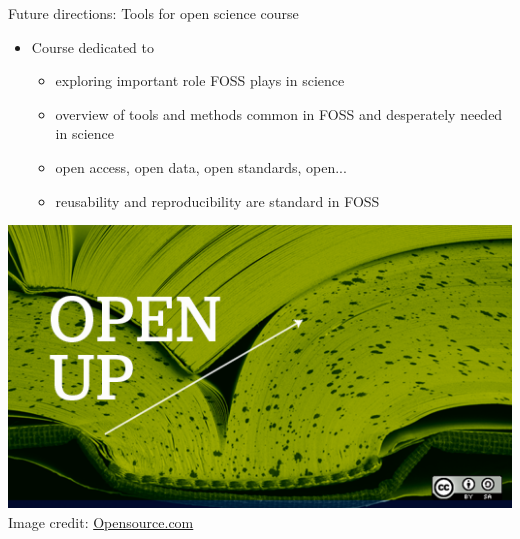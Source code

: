 \documentclass[xcolor={dvipsnames,usenames},beamer,aspectratio=169]{beamer}
\begin{document}
\begin{frame}{Future directions: Tools for open science course}

\begin{overlayarea}{\textwidth}{\textheight}

\begin{itemize}
 \item Course dedicated to
 \begin{itemize}
  \item exploring important role FOSS plays in science
  \item overview of tools and methods common in FOSS and desperately needed in science
  \item open access, open data, open standards, open...
  \item reusability and reproducibility are standard in FOSS
 \end{itemize}
\end{itemize}

\smallskip

\centering
\includegraphics[height=0.5\textheight]{./images/general/open_up_book}%
\\
\tiny
Image credit: \href{https://opensource.com/}{Opensource.com}


\end{overlayarea}

\end{frame}
\end{document}
